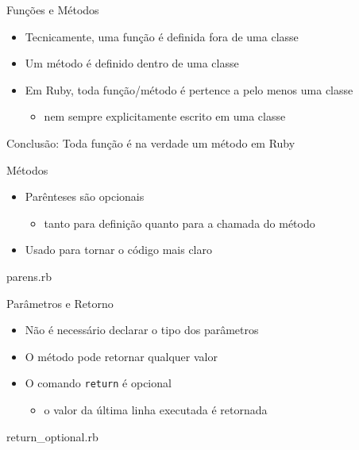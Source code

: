 
\begin{frame}[fragile,t]{Funções e Métodos}
  \begin{itemize}
    \item Tecnicamente, uma \alert{função} é definida \alert{fora} de uma classe
    \item Um \alert{método} é definido dentro de uma classe
    \item Em Ruby, \alert{toda} função/método é pertence a pelo menos uma classe
    \begin{itemize}
      \item nem sempre explicitamente escrito em uma classe
    \end{itemize}
  \end{itemize}
  \framebreak   
  \begin{center}
    Conclusão: Toda \alert{função} é na verdade um \alert{método} em Ruby  
  \end{center}
\end{frame}

\begin{frame}[fragile,t]{Métodos}
  \begin{itemize}
    \item Parênteses são \alert{opcionais}
    \begin{itemize}
      \item tanto para definição quanto para a chamada do método
    \end{itemize}
    \item Usado para tornar o código mais claro
  \end{itemize}
  \begin{block}{parens.rb}
  	
  \end{block}
  
    
\end{frame}

\begin{frame}[fragile,t]{Parâmetros e Retorno}
  \begin{itemize}
    \item Não é necessário declarar o tipo dos parâmetros
    \item O método pode retornar qualquer valor
    \item O comando \verb!return! é opcional
    \begin{itemize}
      \item o valor da \alert{última linha} executada é retornada 
    \end{itemize}
  \end{itemize}
  \begin{block}{return\_optional.rb}
  
  \end{block}  
\end{frame}

